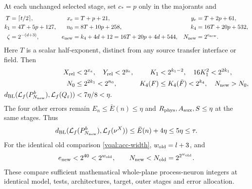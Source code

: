 \begin{theorem}\label{sva:width}
At each unchanged selected stage, set $c_*=p$ only in the majorants and
\begin{align}\label{sva:exponents}
 T&=\lceil t/2\rceil,&x_e&=T+p+21,&y_e&=T+2p+61,\nonumber\\
 k_1&=4T+5p+127,&n_0&=8T+10p+258,&k_4&=16T+20p+532,\nonumber\\
 \zeta&=2^{-(d+3)},&e_{\rm new}&=k_4+4d+12
              =16T+20p+4d+544,&N_{\rm new}&=2^{e_{\rm new}}.
\end{align}
Here $T$ is a scalar half-exponent, distinct from any source transfer
interface or field. Then
\begin{align}\label{sva:enclosure-result}
 X_{\rm rel}&<2^{x_e},\quad Y_{\rm rel}<2^{y_e},
 &K_1&<2^{k_1-2},\quad16K_1^2<2^{2k_1},\nonumber\\
 N_0&\le2^{2k_1}<2^{n_0},
 &K_4(F)&\le K_4(\bar F)<2^{k_4},\quad N_{\rm new}>N_0,\nonumber\\
 d_{\rm BL}(\mathcal L_f(P_{N_{\rm new}}^b),
                \mathcal L_f(Q_\varepsilon))&<7\eta/8<\eta.
\end{align}
The four other errors remain $E_n\le\bar E(n)\le\eta$ and
$R_{\rm phys},A_{\rm aux},S\le\eta$ at the same stages. Thus
\begin{equation}\label{sva:target}
 d_{\rm BL}(\mathcal L_f(P_{N_{\rm new}}^b),\mathcal L_f(\nu^X))
 \le\bar E(n)+4\eta\le5\eta\le\tau.
\end{equation}
For the identical old comparison \eqref{vqal:acc-width},
$w_{\rm old}=l+3$, and
\begin{equation}\label{sva:order}
 e_{\rm new}<2^{40}<2^{w_{\rm old}},\qquad
 N_{\rm new}<N_{\rm old}=2^{2^{w_{\rm old}}}.
\end{equation}
These compare sufficient mathematical whole-plane process-neuron
integers at identical model, tests, architectures, target, outer stages
and error allocation.
\end{theorem}

